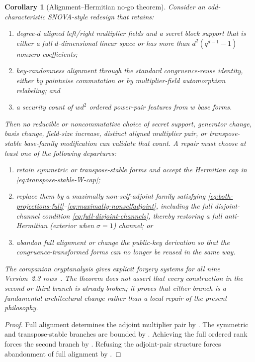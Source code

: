 \documentclass[11pt]{article}
\newtheorem{corollary}[corollary]{Corollary}
\begin{document}
\begin{corollary}[Alignment--Hermitian no-go theorem]
\label{cor:alignment-no-go}
Consider an odd-characteristic SNOVA-style redesign that retains:
\begin{enumerate}[label=(\roman*)]
\item degree-$d$ aligned left/right multiplier fields and a secret block
      support that is either a full $d$-dimensional linear space or has more
      than $d^2(q^{d-1}-1)$ nonzero coefficients;
\item key-randomness alignment through the standard congruence-reuse
      identity, either by pointwise commutation or by multiplier-field
      automorphism relabeling; and
\item a security count of $wd^2$ ordered power-pair features from $w$ base
      forms.
\end{enumerate}
Then no reducible or noncommutative choice of secret support, generator
change, basis change, field-size increase, distinct aligned multiplier pair,
or transpose-stable base-family modification can validate that count.  A repair
must choose at least one of the following departures:
\begin{enumerate}[label=\textbf{\arabic*.}]
\item retain symmetric or transpose-stable forms and accept the Hermitian
      cap in \eqref{eq:transpose-stable-W-cap};
\item replace them by a maximally non-self-adjoint family satisfying
      \eqref{eq:both-projections-full}--\eqref{eq:maximally-nonselfadjoint},
      including the full disjoint-channel condition
      \eqref{eq:full-disjoint-channels}, thereby restoring a full
      anti-Hermitian (exterior when $\sigma=1$) channel; or
\item abandon full alignment or change the public-key derivation so that the
      congruence-transformed forms can no longer be reused in the same way.
\end{enumerate}
The companion cryptanalysis gives explicit forgery systems for all nine
Version~2.3 rows~\cite{ThalerEtAl2026SymmetryQuotient}.  The theorem does not
assert that every construction in the second or third branch is already
broken; it proves that either branch is a fundamental architectural change
rather than a local repair of the present philosophy.
\end{corollary}

\begin{proof}
Full alignment determines the adjoint multiplier pair by
.  The symmetric and
transpose-stable branches are bounded by
.
Achieving the full ordered rank forces the second branch by
.  Refusing the adjoint-pair structure
forces abandonment of full alignment by
.
\end{proof}
\end{document}
